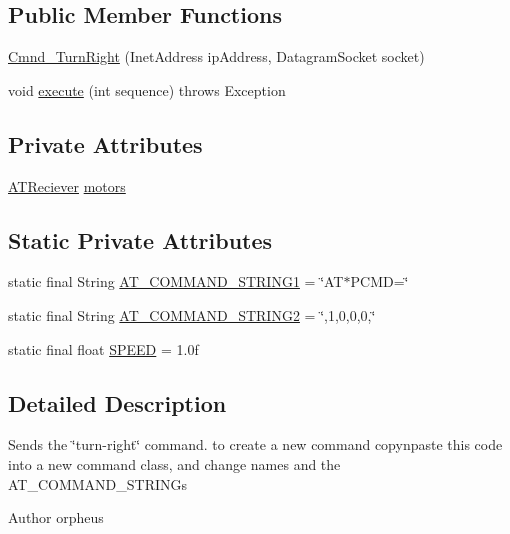 \subsection*{Public Member Functions}
\begin{DoxyCompactItemize}
\item 
\hyperlink{class_drone_1_1_drone_commands_1_1_cmnd___turn_right_a01cdd7a0d2725efd022f45a823cad84a}{Cmnd\+\_\+\+Turn\+Right} (Inet\+Address ip\+Address, Datagram\+Socket socket)
\item 
void \hyperlink{class_drone_1_1_drone_commands_1_1_cmnd___turn_right_af819a07d889e2e667b36e9cf54bd0914}{execute} (int sequence)  throws Exception  	
\end{DoxyCompactItemize}
\subsection*{Private Attributes}
\begin{DoxyCompactItemize}
\item 
\hyperlink{class_drone_1_1_hardware_1_1_a_t_reciever}{A\+T\+Reciever} \hyperlink{class_drone_1_1_drone_commands_1_1_cmnd___turn_right_a180525c1b0947c875771675d16f6de5c}{motors}
\end{DoxyCompactItemize}
\subsection*{Static Private Attributes}
\begin{DoxyCompactItemize}
\item 
static final String \hyperlink{class_drone_1_1_drone_commands_1_1_cmnd___turn_right_a5e54f577b1a4649c80b498cc6e7af3a1}{A\+T\+\_\+\+C\+O\+M\+M\+A\+N\+D\+\_\+\+S\+T\+R\+I\+N\+G1} = \char`\"{}A\+T$\ast$P\+C\+M\+D=\char`\"{}
\item 
static final String \hyperlink{class_drone_1_1_drone_commands_1_1_cmnd___turn_right_a72e5864c377306808a71e9f1537c1ff2}{A\+T\+\_\+\+C\+O\+M\+M\+A\+N\+D\+\_\+\+S\+T\+R\+I\+N\+G2} = \char`\"{},1,0,0,0,\char`\"{}
\item 
static final float \hyperlink{class_drone_1_1_drone_commands_1_1_cmnd___turn_right_a7d3f195015dd0158fd0405865b3c8851}{S\+P\+E\+E\+D} = 1.\+0f
\end{DoxyCompactItemize}


\subsection{Detailed Description}
Sends the \char`\"{}turn-\/right\char`\"{} command. to create a new command copy\textquotesingle{}n\textquotesingle{}paste this code into a new command class, and change names and the A\+T\+\_\+\+C\+O\+M\+M\+A\+N\+D\+\_\+\+S\+T\+R\+I\+N\+G\textquotesingle{}s \begin{DoxyAuthor}{Author}
orpheus 
\end{DoxyAuthor}


